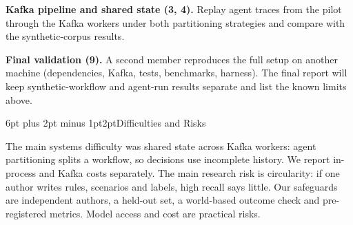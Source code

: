 \documentclass[11pt]{article}
\makeatletter
\renewcommand{\section}{\@startsection{section}{1}{0pt}%
  {6pt plus 2pt minus 1pt}{2pt}{\normalfont\large\bfseries}}
\makeatother
\begin{document}
\textbf{Kafka pipeline and shared state (3, 4).} Replay agent traces from the pilot through the
Kafka workers under both partitioning strategies and compare with the synthetic-corpus results.

\textbf{Final validation (9).} A second member reproduces the full setup on another machine
(dependencies, Kafka, tests, benchmarks, harness). The final report will keep synthetic-workflow
and agent-run results separate and list the known limits above.

\section{Difficulties and Risks}

The main systems difficulty was shared state across Kafka workers: agent partitioning splits a
workflow, so decisions use incomplete history. We report in-process and Kafka costs separately.
The main research risk is circularity: if one author writes rules, scenarios and
labels, high recall says little. Our safeguards are independent authors, a held-out set, a
world-based outcome check and pre-registered metrics. Model access and cost are practical risks.
\end{document}
